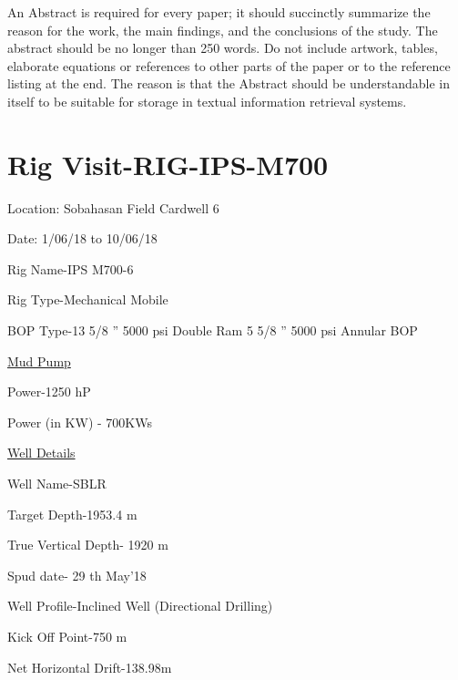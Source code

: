 \documentclass[11pt,a4paper]{report}
\makeatletter
\newcommand\mainmatter{%
    \cleardoublepage
  \pagenumbering{arabic}}
\makeatother
\begin{document}
\vspace{2em}
  
An Abstract is required for every paper; it should succinctly summarize the reason for the work, the main findings, and the conclusions of the study. The abstract should be no longer than 250 words. Do not include artwork, tables, elaborate equations or references to other parts of the paper or to the reference listing at the end. The reason is that the Abstract should be understandable in itself to be suitable for storage in textual information retrieval systems.
  
\newpage


\listoftables


\newpage


\listoffigures


\newpage

\mainmatter

\newpage









\section{\textbf{Rig Visit-RIG-IPS-M700}}

Location: Sobahasan Field Cardwell 6

Date: 1/06/18 to 10/06/18

Rig Name-IPS M700-6

Rig Type-Mechanical Mobile

BOP Type-13 5/8 ” 5000 psi Double Ram \hfill 5 5/8 ” 5000 psi Annular BOP

\underline{Mud Pump}

Power-1250 hP

Power (in KW) - 700KWs

\underline{Well Details}

Well Name-SBLR

Target Depth-1953.4 m

True Vertical Depth- 1920 m

Spud date- 29 th May’18

Well Profile-Inclined Well (Directional Drilling)

Kick Off Point-750 m

Net Horizontal Drift-138.98m
\end{document}
